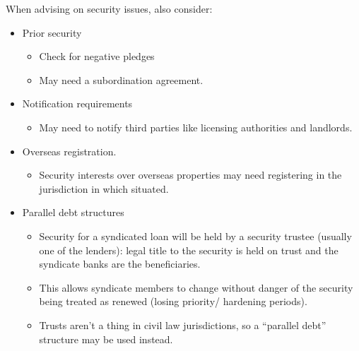 \documentclass[
]{article}
\providecommand{\tightlist}{%
  \setlength{\itemsep}{0pt}\setlength{\parskip}{0pt}}
\begin{document}
When advising on security issues, also consider:

\begin{itemize}
\tightlist
\item
  Prior security

  \begin{itemize}
  \tightlist
  \item
    Check for negative pledges
  \item
    May need a subordination agreement.
  \end{itemize}
\item
  Notification requirements

  \begin{itemize}
  \tightlist
  \item
    May need to notify third parties like licensing authorities and
    landlords.
  \end{itemize}
\item
  Overseas registration.

  \begin{itemize}
  \tightlist
  \item
    Security interests over overseas properties may need registering in
    the jurisdiction in which situated.
  \end{itemize}
\item
  Parallel debt structures

  \begin{itemize}
  \tightlist
  \item
    Security for a syndicated loan will be held by a security trustee
    (usually one of the lenders): legal title to the security is held on
    trust and the syndicate banks are the beneficiaries.
  \item
    This allows syndicate members to change without danger of the
    security being treated as renewed (losing priority/ hardening
    periods).
  \item
    Trusts aren't a thing in civil law jurisdictions, so a ``parallel
    debt'' structure may be used instead.


\end{itemize}
\end{itemize}
\end{document}
